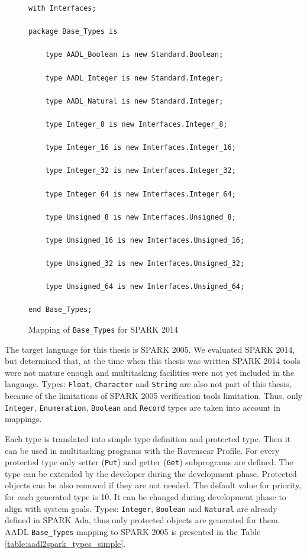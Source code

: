 \begin{figure}%
\singlespacing
\begin{lstlisting}[language=aadl, frame=single, gobble=0]
with Interfaces;

package Base_Types is

	type AADL_Boolean is new Standard.Boolean;

	type AADL_Integer is new Standard.Integer;

	type AADL_Natural is new Standard.Integer;

 	type Integer_8 is new Interfaces.Integer_8;

 	type Integer_16 is new Interfaces.Integer_16;

	type Integer_32 is new Interfaces.Integer_32;

	type Integer_64 is new Interfaces.Integer_64;

	type Unsigned_8 is new Interfaces.Unsigned_8;

	type Unsigned_16 is new Interfaces.Unsigned_16;

	type Unsigned_32 is new Interfaces.Unsigned_32;

	type Unsigned_64 is new Interfaces.Unsigned_64;	

end Base_Types;
\end{lstlisting} 
\doublespacing
\caption{Mapping of \lstinline{Base_Types} for SPARK 2014}
\label{listing:aadl2spark2014_base_types_mapping}
\end{figure}

The target language for this thesis is SPARK 2005. We evaluated SPARK 2014, but determined that, at the time when this thesis was written SPARK 2014 tools were not mature enough and multitasking facilities were not yet included in the language. Types: \lstinline{Float}, \lstinline{Character} and \lstinline{String} are also not part of this thesis, because of the limitations of SPARK 2005 verification tools limitation. Thus, only \lstinline{Integer}, \lstinline{Enumeration}, \lstinline{Boolean} and \lstinline{Record} types are taken into account in mappings.

Each type is translated into simple type definition and protected type. Then it can be used in multitasking programs with the Ravenscar Profile. For every protected type only setter (\lstinline{Put}) and getter (\lstinline{Get}) subprograms are defined. The type can be extended by the developer during the development phase. Protected objects can be also removed if they are not needed. The default value for priority, for each generated type is 10. It can be changed during development phase to align with system goals. Types: \lstinline{Integer}, \lstinline{Boolean} and \lstinline{Natural} are already defined in SPARK Ada, thus only protected objects are generated for them. AADL \lstinline{Base_Types} mapping to SPARK 2005 is presented in the Table \ref{table:aadl2spark_types_simple}.

